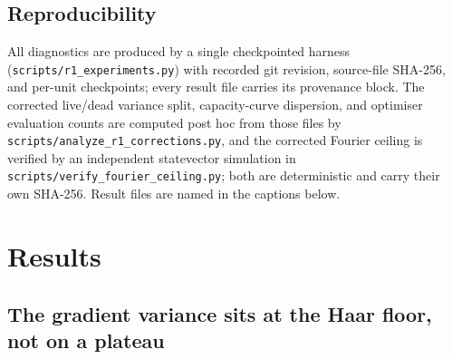 \documentclass[a4paper,12pt]{iopart}
\begin{document}
\subsection{Reproducibility}

All diagnostics are produced by a single checkpointed harness
(\texttt{scripts/r1\_experiments.py}) with recorded git revision, source-file
SHA-256, and per-unit checkpoints; every result file carries its provenance
block. The corrected live/dead variance split, capacity-curve dispersion, and
optimiser evaluation counts are computed post hoc from those files by
\texttt{scripts/analyze\_r1\_corrections.py}, and the corrected Fourier ceiling
is verified by an independent statevector simulation in
\texttt{scripts/verify\_fourier\_ceiling.py}; both are deterministic and carry
their own SHA-256. Result files are named in the captions below.

\section{Results}
\label{sec:results}

\subsection{The gradient variance sits at the Haar floor, not on a plateau}
\label{ssec:variance}
\end{document}
